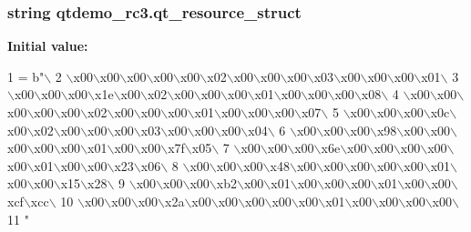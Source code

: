 \subsubsection[{qt\+\_\+resource\+\_\+struct}]{\setlength{\rightskip}{0pt plus 5cm}string qtdemo\+\_\+rc3.\+qt\+\_\+resource\+\_\+struct}\label{namespaceqtdemo__rc3_a2b42e0193c31ff1564eab2a851f24503}
{\bfseries Initial value\+:}
\begin{DoxyCode}
1 = b\textcolor{stringliteral}{"\(\backslash\)}
2 \textcolor{stringliteral}{\(\backslash\)x00\(\backslash\)x00\(\backslash\)x00\(\backslash\)x00\(\backslash\)x00\(\backslash\)x02\(\backslash\)x00\(\backslash\)x00\(\backslash\)x00\(\backslash\)x03\(\backslash\)x00\(\backslash\)x00\(\backslash\)x00\(\backslash\)x01\(\backslash\)}
3 \textcolor{stringliteral}{\(\backslash\)x00\(\backslash\)x00\(\backslash\)x00\(\backslash\)x1e\(\backslash\)x00\(\backslash\)x02\(\backslash\)x00\(\backslash\)x00\(\backslash\)x00\(\backslash\)x01\(\backslash\)x00\(\backslash\)x00\(\backslash\)x00\(\backslash\)x08\(\backslash\)}
4 \textcolor{stringliteral}{\(\backslash\)x00\(\backslash\)x00\(\backslash\)x00\(\backslash\)x00\(\backslash\)x00\(\backslash\)x02\(\backslash\)x00\(\backslash\)x00\(\backslash\)x00\(\backslash\)x01\(\backslash\)x00\(\backslash\)x00\(\backslash\)x00\(\backslash\)x07\(\backslash\)}
5 \textcolor{stringliteral}{\(\backslash\)x00\(\backslash\)x00\(\backslash\)x00\(\backslash\)x0c\(\backslash\)x00\(\backslash\)x02\(\backslash\)x00\(\backslash\)x00\(\backslash\)x00\(\backslash\)x03\(\backslash\)x00\(\backslash\)x00\(\backslash\)x00\(\backslash\)x04\(\backslash\)}
6 \textcolor{stringliteral}{\(\backslash\)x00\(\backslash\)x00\(\backslash\)x00\(\backslash\)x98\(\backslash\)x00\(\backslash\)x00\(\backslash\)x00\(\backslash\)x00\(\backslash\)x00\(\backslash\)x01\(\backslash\)x00\(\backslash\)x00\(\backslash\)x7f\(\backslash\)x05\(\backslash\)}
7 \textcolor{stringliteral}{\(\backslash\)x00\(\backslash\)x00\(\backslash\)x00\(\backslash\)x6e\(\backslash\)x00\(\backslash\)x00\(\backslash\)x00\(\backslash\)x00\(\backslash\)x00\(\backslash\)x01\(\backslash\)x00\(\backslash\)x00\(\backslash\)x23\(\backslash\)x06\(\backslash\)}
8 \textcolor{stringliteral}{\(\backslash\)x00\(\backslash\)x00\(\backslash\)x00\(\backslash\)x48\(\backslash\)x00\(\backslash\)x00\(\backslash\)x00\(\backslash\)x00\(\backslash\)x00\(\backslash\)x01\(\backslash\)x00\(\backslash\)x00\(\backslash\)x15\(\backslash\)x28\(\backslash\)}
9 \textcolor{stringliteral}{\(\backslash\)x00\(\backslash\)x00\(\backslash\)x00\(\backslash\)xb2\(\backslash\)x00\(\backslash\)x01\(\backslash\)x00\(\backslash\)x00\(\backslash\)x00\(\backslash\)x01\(\backslash\)x00\(\backslash\)x00\(\backslash\)xcf\(\backslash\)xcc\(\backslash\)}
10 \textcolor{stringliteral}{\(\backslash\)x00\(\backslash\)x00\(\backslash\)x00\(\backslash\)x2a\(\backslash\)x00\(\backslash\)x00\(\backslash\)x00\(\backslash\)x00\(\backslash\)x00\(\backslash\)x01\(\backslash\)x00\(\backslash\)x00\(\backslash\)x00\(\backslash\)x00\(\backslash\)}
11 \textcolor{stringliteral}{"}
\end{DoxyCode}
